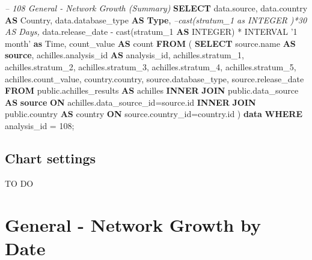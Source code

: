 \documentclass[]{book}
\newenvironment{Shaded}{\begin{snugshade}}{\end{snugshade}}
\newcommand{\KeywordTok}[1]{\textcolor[rgb]{0.13,0.29,0.53}{\textbf{#1}}}
\newcommand{\DataTypeTok}[1]{\textcolor[rgb]{0.13,0.29,0.53}{#1}}
\newcommand{\DecValTok}[1]{\textcolor[rgb]{0.00,0.00,0.81}{#1}}
\newcommand{\StringTok}[1]{\textcolor[rgb]{0.31,0.60,0.02}{#1}}
\newcommand{\CommentTok}[1]{\textcolor[rgb]{0.56,0.35,0.01}{\textit{#1}}}
\newcommand{\FunctionTok}[1]{\textcolor[rgb]{0.00,0.00,0.00}{#1}}
\newcommand{\NormalTok}[1]{#1}
\begin{document}
\begin{Shaded}
\begin{Highlighting}[]
\CommentTok{-- 108    General - Network Growth (Summary)}
\KeywordTok{SELECT}\NormalTok{ data.source,}
\NormalTok{       data.country }\KeywordTok{AS}\NormalTok{ Country,}
\NormalTok{       data.database_type }\KeywordTok{AS} \KeywordTok{Type}\NormalTok{,}
       \CommentTok{--cast(stratum_1 as INTEGER )*30 AS Days,}
\NormalTok{       data.release_date - }\FunctionTok{cast}\NormalTok{(stratum_1 }\KeywordTok{AS} \DataTypeTok{INTEGER}\NormalTok{) * }\DataTypeTok{INTERVAL} 
        \StringTok{'1 month'} \KeywordTok{as} \DataTypeTok{Time}\NormalTok{,}
\NormalTok{       count_value                   }\KeywordTok{AS} \FunctionTok{count}
\KeywordTok{FROM}\NormalTok{ (}
     \KeywordTok{SELECT}\NormalTok{ source.name              }\KeywordTok{AS} \KeywordTok{source}\NormalTok{,}
\NormalTok{            achilles.analysis_id     }\KeywordTok{AS}\NormalTok{ analysis_id,}
\NormalTok{            achilles.stratum_1,}
\NormalTok{            achilles.stratum_2,}
\NormalTok{            achilles.stratum_3,}
\NormalTok{            achilles.stratum_4,}
\NormalTok{            achilles.stratum_5,}
\NormalTok{            achilles.count_value,}
\NormalTok{            country.country,}
\NormalTok{            source.database_type, }
\NormalTok{            source.release_date}
     \KeywordTok{FROM}\NormalTok{ public.achilles_results }\KeywordTok{AS}\NormalTok{ achilles }\KeywordTok{INNER} \KeywordTok{JOIN} 
\NormalTok{      public.data_source }\KeywordTok{AS} \KeywordTok{source} \KeywordTok{ON}
\NormalTok{      achilles.data_source_id=source.id}
     \KeywordTok{INNER} \KeywordTok{JOIN}\NormalTok{ public.country }\KeywordTok{AS}\NormalTok{ country }\KeywordTok{ON} 
\NormalTok{      source.country_id=country.id}
\NormalTok{     ) }\KeywordTok{data}
\KeywordTok{WHERE}\NormalTok{ analysis_id = }\DecValTok{108}\NormalTok{;}
\end{Highlighting}
\end{Shaded}

\subsection{Chart settings}\label{chart-settings-3}

TO DO

\section{General - Network Growth by
Date}\label{general---network-growth-by-date}
\end{document}
